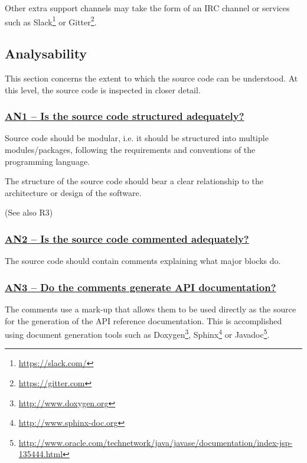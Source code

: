 \documentclass[a4paper,11pt]{article}
\newcommand{\criterion}[1]{\subsubsection*{\underline{#1}}}
\begin{document}
Other extra support channels may take the form of an IRC channel or services
such as Slack\footnote{\url{https://slack.com/}} or
Gitter\footnote{\url{https://gitter.com}}.

\subsection{Analysability}\label{sec:ana}

This section concerns the extent to which the source code can be understood. At
this level, the source code is inspected in closer detail.

\newcommand{\anOneID}{AN1}
\newcommand{\anOneText}{Is the source code structured adequately?}
\criterion{\anOneID{ }--{ }\anOneText}\label{id:an1} 

Source code should be modular, i.e. it should be structured into multiple
modules/packages, following the requirements and conventions of the programming
language. 

The structure of the source code should bear a clear relationship to the
architecture or design of the software.

(See also R3)

\newcommand{\anTwoID}{AN2}
\newcommand{\anTwoText}{Is the source code commented adequately?}
\criterion{\anTwoID{ }--{ }\anTwoText}\label{id:an2} 

The source code should contain comments explaining what major blocks do.

\newcommand{\anThreeID}{AN3}
\newcommand{\anThreeText}{Do the comments generate API documentation?}
\criterion{\anThreeID{ }--{ }\anThreeText}\label{id:an3} 

The comments use a mark-up that allows them to be used directly as the
source for the generation of the API reference documentation. This is
%
%
%
accomplished using document generation tools such as Doxygen\footnote{\url{http://www.doxygen.org}}, Sphinx\footnote{\url{http://www.sphinx-doc.org}} or
Javadoc\footnote{\url{http://www.oracle.com/technetwork/java/javase/documentation/index-jsp-135444.html}}.
\end{document}
